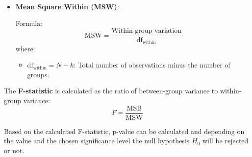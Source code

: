 \begin{itemize}
    \item \textbf{Mean Square Within (MSW)}:
    
    Formula:
    \[
    \text{MSW} = \frac{\text{Within-group \ variation}}{\text{df}_{\text{within}}}
    \]
    \noindent \noindent where:
    \begin{itemize}
        \item \( \text{df}_{\text{within}} = N - k \): Total number of observations minus the number of groups.
    \end{itemize}
\end{itemize}


\noindent \noindent The \textbf{F-statistic} is calculated as the ratio of
between-group variance to within-group variance:
\[
F = \frac{\text{MSB}}{\text{MSW}}
\]


Based on the calculated F-statistic, p-value can be calculated and depending on
the value and the chosen significance level the null hypothesis $H_0$ will be
rejected or not.
